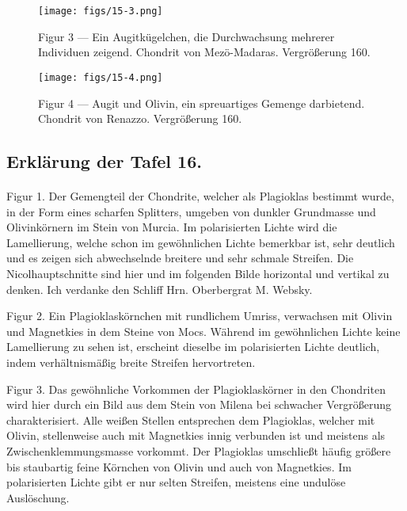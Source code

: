 \documentclass[a4paper, 12pt, oneside]{article}
\begin{document}
\vspace*{\fill}
\begin{figure}[H]
\centering
\texttt{[image: figs/15-3.png]}
\caption{\small Figur 3 --- Ein Augitkügelchen, die Durchwachsung mehrerer Individuen zeigend. Chondrit von Mezö-Madaras. Vergrößerung 160.}
\end{figure}
\vspace*{\fill}
\clearpage

\vspace*{\fill}
\begin{figure}[H]
\centering
\texttt{[image: figs/15-4.png]}
\caption{\small Figur 4 --- Augit und Olivin, ein spreuartiges Gemenge darbietend. Chondrit von Renazzo. Vergrößerung 160.}
\end{figure}
\vspace*{\fill}
\clearpage

\subsection{Erklärung der Tafel 16.}
\paragraph{}
Figur 1. Der Gemengteil der Chondrite, welcher als Plagioklas bestimmt wurde, in der Form eines scharfen Splitters, umgeben von dunkler Grundmasse und Olivinkörnern im Stein von Murcia. Im polarisierten Lichte wird die Lamellierung, welche schon im gewöhnlichen Lichte bemerkbar ist, sehr deutlich und es zeigen sich abwechselnde breitere und sehr schmale Streifen. Die Nicolhauptschnitte sind hier und im folgenden Bilde horizontal und vertikal zu denken. Ich verdanke den Schliff Hrn. Oberbergrat M. Websky.

Figur 2. Ein Plagioklaskörnchen mit rundlichem Umriss, verwachsen mit Olivin und Magnetkies in dem Steine von Mocs. Während im gewöhnlichen Lichte keine Lamellierung zu sehen ist, erscheint dieselbe im polarisierten Lichte deutlich, indem verhältnismäßig breite Streifen hervortreten.

Figur 3. Das gewöhnliche Vorkommen der Plagioklaskörner in den Chondriten wird hier durch ein Bild aus dem Stein von Milena bei schwacher Vergrößerung charakterisiert. Alle weißen Stellen entsprechen dem Plagioklas, welcher mit Olivin, stellenweise auch mit Magnetkies innig verbunden ist und meistens als Zwischenklemmungsmasse vorkommt. Der Plagioklas umschließt häufig größere bis staubartig feine Körnchen von Olivin und auch von Magnetkies. Im polarisierten Lichte gibt er nur selten Streifen, meistens eine undulöse Auslöschung.
\end{document}
